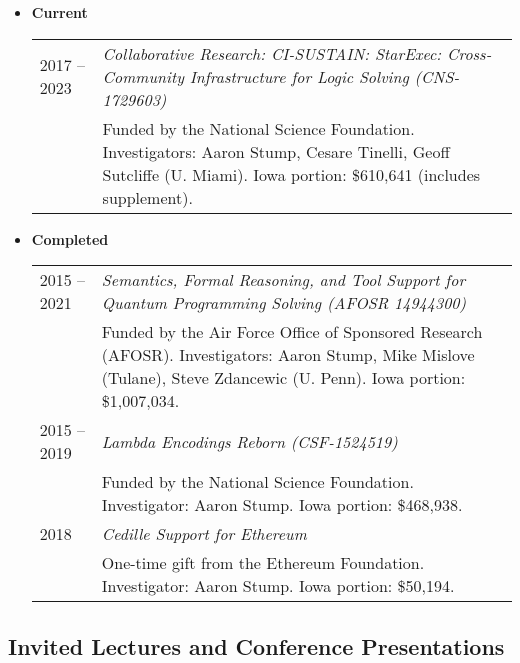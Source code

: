 \documentclass[10pt]{article}
\begin{document}
\begin{itemize}

\item[] \textbf{Current}
\\[1.3ex]
\begin{tabular}{l@{\quad\ }p{34em}} 
 2017 -- 2023
 & \emph{Collaborative Research: CI-SUSTAIN: StarExec: Cross-Community Infrastructure for Logic Solving (CNS-1729603)} \\
 & Funded by the National Science Foundation. 
   Investigators: Aaron Stump, Cesare Tinelli, Geoff Sutcliffe (U. Miami). 
   Iowa portion: \$610,641 (includes supplement).
   \smallskip \\
\end{tabular}


\item[] \textbf{Completed}
\\[1.3ex]
\begin{tabular}{l@{\quad\ }p{34em}} 
 2015 -- 2021 
 & \emph{Semantics, Formal Reasoning, and Tool Support for Quantum Programming Solving (AFOSR 14944300)} \\
 & Funded by the Air Force Office of Sponsored Research (AFOSR). 
   Investigators: Aaron Stump, Mike Mislove (Tulane), Steve Zdancewic (U. Penn).
   Iowa portion: \$1,007,034.
   \smallskip \\
 2015 -- 2019
 & \emph{Lambda Encodings Reborn (CSF-1524519)} \\
 & Funded by the National Science Foundation. 
   Investigator: Aaron Stump.
   Iowa portion: \$468,938.
   \smallskip \\
 2018
 & \emph{Cedille Support for Ethereum} \\
 & One-time gift from the Ethereum Foundation. 
   Investigator: Aaron Stump.
   Iowa portion: \$50,194.

\end{tabular}

\end{itemize}

\subsection*{Invited Lectures and Conference Presentations}
\smallskip
\end{document}
